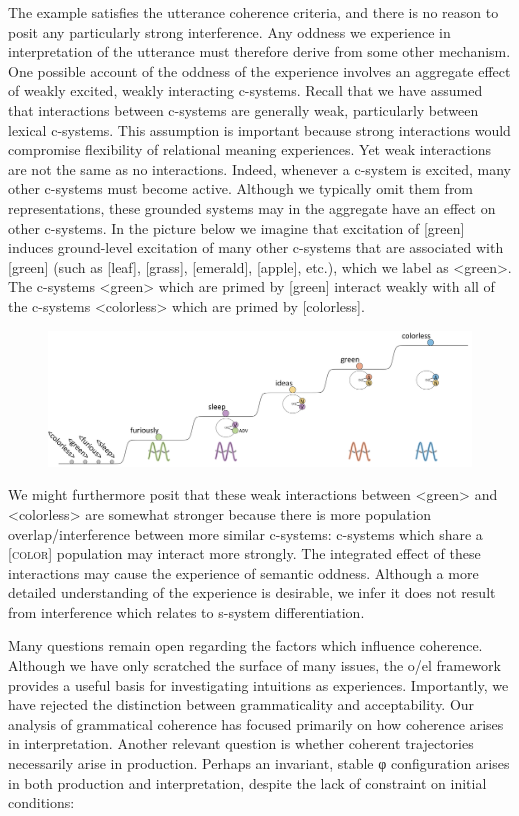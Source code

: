   The example satisfies the utterance coherence criteria, and there is no reason to posit any particularly strong interference. Any oddness we experience in interpretation of the utterance must therefore derive from some other mechanism. One possible account of the oddness of the experience involves an aggregate effect of weakly excited, weakly interacting c-systems. Recall that we have assumed that interactions between c-systems are generally weak, particularly between lexical c-systems. This assumption is important because strong interactions would compromise flexibility of relational meaning experiences. Yet weak interactions are not the same as no interactions. Indeed, whenever a c-system is excited, many other c-systems must become active. Although we typically omit them from representations, these grounded systems may in the aggregate have an effect on other c-systems. In the picture below we imagine that excitation of [green] induces ground-level excitation of many other c-systems that are associated with [green] (such as [leaf], [grass], [emerald], [apple], etc.), which we label as <green>. The c-systems <green> which are primed by [green] interact weakly with all of the c-systems <colorless> which are primed by [colorless]. 

  
\begin{figure}
\includegraphics[width=\textwidth]{figures/Tilsen-img134.png}
\caption{\missingcaption}
\label{fig:}
\end{figure}
 

  We might furthermore posit that these weak interactions between <green> and <colorless> are somewhat stronger because there is more population overlap/interference between more similar c-systems: c-systems which share a [\textsc{color}] population may interact more strongly. The integrated effect of these interactions may cause the experience of semantic oddness. Although a more detailed understanding of the experience is desirable, we infer it does not result from interference which relates to s-system differentiation.

  Many questions remain open regarding the factors which influence coherence. Although we have only scratched the surface of many issues, the o/el framework provides a useful basis for investigating intuitions as experiences. Importantly, we have rejected the distinction between grammaticality and acceptability. Our analysis of grammatical coherence has focused primarily on how coherence arises in interpretation. Another relevant question is whether coherent trajectories necessarily arise in production. Perhaps an invariant, stable φ configuration arises in both production and interpretation, despite the lack of constraint on initial conditions:


